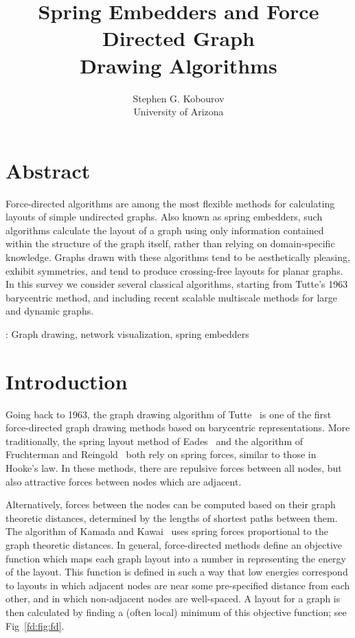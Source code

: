 \documentclass[notitlepage,letter,11pt]{article}
\title{Spring Embedders and Force Directed Graph\\ Drawing Algorithms}
\author{Stephen G. Kobourov\\University of Arizona}
\begin{document}
\maketitle



\section*{Abstract}
Force-directed algorithms are among the most flexible methods for calculating layouts of simple undirected graphs. Also known as spring embedders, such algorithms calculate
the layout of a graph using only information contained within the
structure of the graph itself, rather than relying on domain-specific
knowledge.  Graphs drawn with these algorithms tend to be
aesthetically pleasing, exhibit symmetries, and tend to produce
crossing-free layouts for planar graphs. In this survey we consider several classical algorithms, starting from Tutte's 1963 barycentric method, and including recent scalable multiscale methods for large and dynamic graphs. 


\bigskip
{}: Graph drawing, network visualization, spring embedders


\section{Introduction}
\label{fd:sec:intro}







Going back to 1963, the graph drawing algorithm of
Tutte~\cite{t-hdg-63} is one of the first force-directed graph drawing
methods based on barycentric representations.  More traditionally, the
spring layout method of Eades~\cite{Eades+1984a} and the algorithm of
Fruchterman and Reingold~\cite{fr-gdfdp-91} both rely on spring
forces, similar to those in Hooke's law. In these methods, there are
repulsive forces between all nodes, but also attractive forces between
nodes which are adjacent.  

Alternatively, forces between the nodes can be computed based on their
graph theoretic distances, determined by the lengths of shortest paths
between them. The algorithm of Kamada and Kawai~\cite{kk-adgug-89}
uses spring forces proportional to the graph theoretic distances. In
general, force-directed methods define an objective function which
maps each graph layout into a number in  representing the
energy of the layout.  This function is defined in such a way that low
energies correspond to layouts in which adjacent nodes are near some
pre-specified distance from each other, and in which non-adjacent
nodes are well-spaced.  A layout for a graph is then calculated by
finding a (often local) minimum of this objective function; see
Fig~\ref{fd:fig:fd}.
\end{document}
